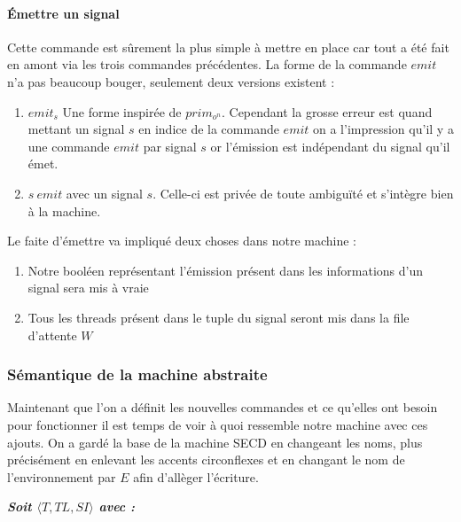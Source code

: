 \documentclass[10pt,a4paper]{article}
\begin{document}
						
						
						
				\paragraph{Émettre un signal}
						
					Cette commande est sûrement la plus simple à mettre en place car tout a été fait en amont via les trois commandes précédentes. La forme de la commande $emit$ n'a pas beaucoup bouger, seulement deux versions existent :
					\begin{enumerate}
						\item $emit_{s}$ Une forme inspirée de $prim_{o^{n}}$. Cependant la grosse erreur est quand mettant un signal $s$ en indice de la commande $emit$ on a l'impression qu'il y a une commande $emit$ par signal $s$ or l'émission est indépendant du signal qu'il émet.
						\item $s~emit$ avec un signal $s$. Celle-ci est privée de toute ambiguïté et s'intègre bien à la machine. 
					\end{enumerate}
					\medbreak
						
					Le faite d'émettre va impliqué deux choses dans notre machine :
					\begin{enumerate}					
						\item Notre booléen représentant l'émission présent dans les informations d'un signal sera mis à vraie
						\item Tous les threads présent dans le tuple du signal seront mis dans la file d'attente $W$ 
					\end{enumerate} 
					\newpage
				
				
					
					
			\subsubsection{Sémantique de la machine abstraite}
				
				Maintenant que l'on a définit les nouvelles commandes et ce qu'elles ont besoin pour fonctionner il est temps de voir à quoi ressemble notre machine avec ces ajouts. On a gardé la base de la machine SECD en changeant les noms, plus précisément en enlevant les accents circonflexes et en changant le nom de l'environnement par $E$ afin d'allèger l'écriture.
				\bigbreak
					
					
				\textbf{\textit{Soit $\langle T,TL,SI\rangle$ avec :}}
					
\end{document}
